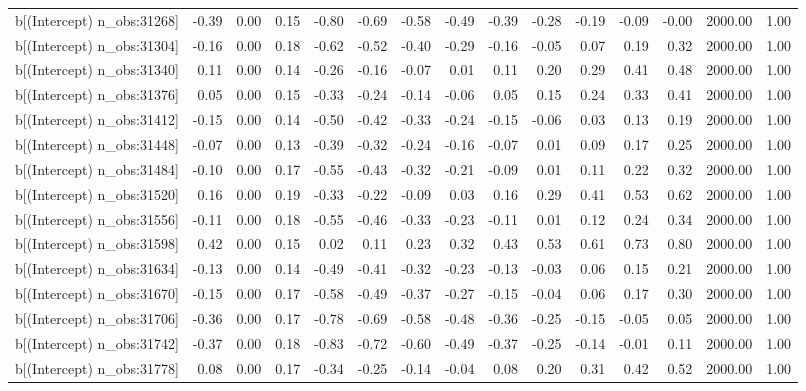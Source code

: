\begin{table}[ht]
\begin{tabular}{rrrrrrrrrrrrrrr}
  b[(Intercept) n\_obs:31268] & -0.39 & 0.00 & 0.15 & -0.80 & -0.69 & -0.58 & -0.49 & -0.39 & -0.28 & -0.19 & -0.09 & -0.00 & 2000.00 & 1.00 \\ 
  b[(Intercept) n\_obs:31304] & -0.16 & 0.00 & 0.18 & -0.62 & -0.52 & -0.40 & -0.29 & -0.16 & -0.05 & 0.07 & 0.19 & 0.32 & 2000.00 & 1.00 \\ 
  b[(Intercept) n\_obs:31340] & 0.11 & 0.00 & 0.14 & -0.26 & -0.16 & -0.07 & 0.01 & 0.11 & 0.20 & 0.29 & 0.41 & 0.48 & 2000.00 & 1.00 \\ 
  b[(Intercept) n\_obs:31376] & 0.05 & 0.00 & 0.15 & -0.33 & -0.24 & -0.14 & -0.06 & 0.05 & 0.15 & 0.24 & 0.33 & 0.41 & 2000.00 & 1.00 \\ 
  b[(Intercept) n\_obs:31412] & -0.15 & 0.00 & 0.14 & -0.50 & -0.42 & -0.33 & -0.24 & -0.15 & -0.06 & 0.03 & 0.13 & 0.19 & 2000.00 & 1.00 \\ 
  b[(Intercept) n\_obs:31448] & -0.07 & 0.00 & 0.13 & -0.39 & -0.32 & -0.24 & -0.16 & -0.07 & 0.01 & 0.09 & 0.17 & 0.25 & 2000.00 & 1.00 \\ 
  b[(Intercept) n\_obs:31484] & -0.10 & 0.00 & 0.17 & -0.55 & -0.43 & -0.32 & -0.21 & -0.09 & 0.01 & 0.11 & 0.22 & 0.32 & 2000.00 & 1.00 \\ 
  b[(Intercept) n\_obs:31520] & 0.16 & 0.00 & 0.19 & -0.33 & -0.22 & -0.09 & 0.03 & 0.16 & 0.29 & 0.41 & 0.53 & 0.62 & 2000.00 & 1.00 \\ 
  b[(Intercept) n\_obs:31556] & -0.11 & 0.00 & 0.18 & -0.55 & -0.46 & -0.33 & -0.23 & -0.11 & 0.01 & 0.12 & 0.24 & 0.34 & 2000.00 & 1.00 \\ 
  b[(Intercept) n\_obs:31598] & 0.42 & 0.00 & 0.15 & 0.02 & 0.11 & 0.23 & 0.32 & 0.43 & 0.53 & 0.61 & 0.73 & 0.80 & 2000.00 & 1.00 \\ 
  b[(Intercept) n\_obs:31634] & -0.13 & 0.00 & 0.14 & -0.49 & -0.41 & -0.32 & -0.23 & -0.13 & -0.03 & 0.06 & 0.15 & 0.21 & 2000.00 & 1.00 \\ 
  b[(Intercept) n\_obs:31670] & -0.15 & 0.00 & 0.17 & -0.58 & -0.49 & -0.37 & -0.27 & -0.15 & -0.04 & 0.06 & 0.17 & 0.30 & 2000.00 & 1.00 \\ 
  b[(Intercept) n\_obs:31706] & -0.36 & 0.00 & 0.17 & -0.78 & -0.69 & -0.58 & -0.48 & -0.36 & -0.25 & -0.15 & -0.05 & 0.05 & 2000.00 & 1.00 \\ 
  b[(Intercept) n\_obs:31742] & -0.37 & 0.00 & 0.18 & -0.83 & -0.72 & -0.60 & -0.49 & -0.37 & -0.25 & -0.14 & -0.01 & 0.11 & 2000.00 & 1.00 \\ 
  b[(Intercept) n\_obs:31778] & 0.08 & 0.00 & 0.17 & -0.34 & -0.25 & -0.14 & -0.04 & 0.08 & 0.20 & 0.31 & 0.42 & 0.52 & 2000.00 & 1.00 \\ 

\end{tabular}
\end{table}

